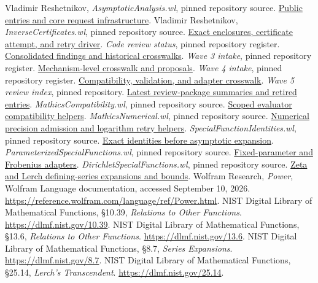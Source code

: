 \documentclass[11pt,a4paper]{article}
\newcommand{\rev}{8cee870994f506b501bae3ea6bd4a3a7edb895c1}
\newcommand{\repo}{https://github.com/VladimirReshetnikov/Asymptotic}
\newcommand{\source}[2]{\href{\repo/blob/\rev/#1}{#2}}
\begin{document}
\clearpage
\begin{thebibliography}{20}
\small
{} Vladimir Reshetnikov, \emph{AsymptoticAnalysis.wl}, pinned repository source. \source{src/Kernel/AsymptoticAnalysis.wl}{Public entries and core request infrastructure}.
 Vladimir Reshetnikov, \emph{InverseCertificates.wl}, pinned repository source. \source{src/Kernel/InverseCertificates.wl}{Exact enclosures, certificate attempt, and retry driver}.
 \emph{Code review status}, pinned repository register. \source{docs/development/CODE_REVIEW_STATUS.md}{Consolidated findings and historical crosswalks}.
 \emph{Wave 3 intake}, pinned repository register. \source{docs/development/WAVE_3_INTAKE.md}{Mechanism-level crosswalk and proposals}.
 \emph{Wave 4 intake}, pinned repository register. \source{docs/development/WAVE_4_INTAKE.md}{Compatibility, validation, and adapter crosswalk}.
 \emph{Wave 5 review index}, pinned repository. \source{external-reports/code-review/wave-5/README.md}{Latest review-package summaries and retired entries}.
 \emph{MathicsCompatibility.wl}, pinned repository source. \source{src/Kernel/MathicsCompatibility.wl}{Scoped evaluator compatibility helpers}.
 \emph{MathicsNumerical.wl}, pinned repository source. \source{src/Kernel/MathicsNumerical.wl}{Numerical precision admission and logarithm retry helpers}.
 \emph{SpecialFunctionIdentities.wl}, pinned repository source. \source{src/Kernel/SpecialFunctionIdentities.wl}{Exact identities before asymptotic expansion}.
 \emph{ParameterizedSpecialFunctions.wl}, pinned repository source. \source{src/Kernel/ParameterizedSpecialFunctions.wl}{Fixed-parameter and Frobenius adapters}.
 \emph{DirichletSpecialFunctions.wl}, pinned repository source. \source{src/Kernel/DirichletSpecialFunctions.wl}{Zeta and Lerch defining-series expansions and bounds}.
 Wolfram Research, \emph{Power}, Wolfram Language documentation, accessed September 10, 2026. \url{https://reference.wolfram.com/language/ref/Power.html}.
 NIST Digital Library of Mathematical Functions, \S10.39, \emph{Relations to Other Functions}. \url{https://dlmf.nist.gov/10.39}.
 NIST Digital Library of Mathematical Functions, \S13.6, \emph{Relations to Other Functions}. \url{https://dlmf.nist.gov/13.6}.
 NIST Digital Library of Mathematical Functions, \S8.7, \emph{Series Expansions}. \url{https://dlmf.nist.gov/8.7}.
 NIST Digital Library of Mathematical Functions, \S25.14, \emph{Lerch's Transcendent}. \url{https://dlmf.nist.gov/25.14}.
\end{thebibliography}
\end{document}
